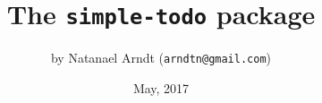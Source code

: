 \documentclass[a4paper]{article}
\begin{document}
\title{The \texttt{simple-todo} package}
\author{by Natanael Arndt (\texttt{arndtn@gmail.com})}
\date{May, 2017}

\maketitle

\end{document}
